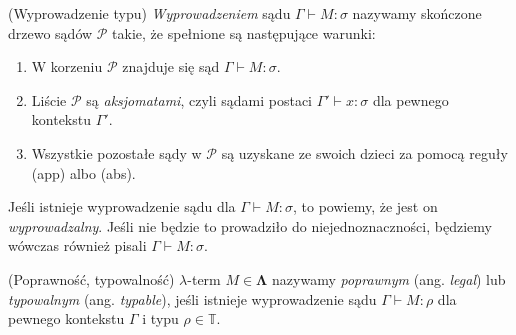 \begin{definicja}(Wyprowadzenie typu) 
  \emph{Wyprowadzeniem} sądu \(\Gamma\vdash M:\sigma\) nazywamy skończone drzewo sądów \(\mathcal{P}\) takie, że spełnione są następujące warunki:
  \begin{enumerate}[label=(D\arabic*)]
      \setlength\itemsep{0em}
      \item W korzeniu \(\mathcal{P}\) znajduje się sąd \(\Gamma \vdash M:\sigma\).
      \item Liście \(\mathcal{P}\) są \emph{aksjomatami}, czyli sądami postaci \(\Gamma' \vdash x:\sigma\) dla pewnego kontekstu \(\Gamma'\).
      \item Wszystkie pozostałe sądy w \(\mathcal{P}\) są uzyskane ze swoich dzieci za pomocą reguły (app) albo (abs).
  \end{enumerate}
  Jeśli istnieje wyprowadzenie sądu dla \(\Gamma\vdash M:\sigma\), to powiemy, że jest on \emph{wyprowadzalny}. 
  Jeśli nie będzie to prowadziło do niejednoznaczności, będziemy wówczas również pisali \(\Gamma\vdash M:\sigma\).
\end{definicja}

\begin{definicja}(Poprawność, typowalność)
  \(\lambda\)-term \(M\in\mathbf{\Lambda}\) nazywamy \emph{poprawnym} (ang. \emph{legal}) lub \emph{typowalnym} (ang. \emph{typable}), jeśli istnieje wyprowadzenie sądu \(\Gamma\vdash M:\rho\) dla pewnego kontekstu \(\Gamma\) i typu \(\rho\in\mathbb{T}\). \end{definicja}

